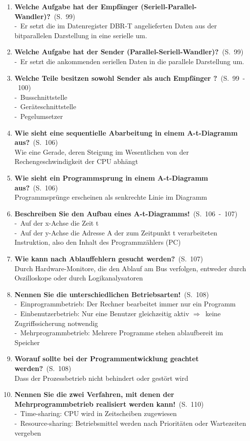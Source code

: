 \documentclass[a4paper,12pt]{article}
\newcommand{\question}[3]{\pagebreak[3]\item {\textbf{#1?}}\ (S.\ #2)#3}
\newcommand{\statement}[3]{\pagebreak[3]\item {\textbf{#1!}}\ (S.\ #2)#3}
\newcommand{\catchword}[1]{\\-\ #1}
\newcommand{\normaltext}[1]{\\#1}
\newcommand{\resultol}[1]{$\Rightarrow$\ #1}
\newcommand{\page}[1]{#1}
\newcommand{\pages}[2]{#1\ -\ #2}
\begin{document}
\begin{enumerate}
    \question{Welche Aufgabe hat der Empfänger (Seriell-Parallel-Wandler)}{\page{99}}
  {
    \catchword{Er setzt die im Datenregister DBR-T angelieferten Daten aus der bitparallelen 
               Darstellung in eine serielle um.}
  }

  \question{Welche Aufgabe hat der Sender (Parallel-Seriell-Wandler)}{\page{99}}
  {
    \catchword{Er setzt die ankommenden seriellen Daten in die parallele Darstellung um.}
  }

  \question{Welche Teile besitzen sowohl Sender als auch Empfänger }{\pages{99}{100}}
  {
    \catchword{Busschnittstelle}
    \catchword{Geräteschnittstelle}
    \catchword{Pegelumsetzer}
  }

  \question{Wie sieht eine sequentielle Abarbeitung in einem A-t-Diagramm aus}{\page{106}}
  {
    \normaltext{Wie eine Gerade, deren Steigung im Wesentlichen von der Rechengeschwindigkeit
                der CPU abhängt}
  }

  \question{Wie sieht ein Programmsprung in einem A-t-Diagramm aus}{\page{106}}
  {
    \normaltext{Programmsprünge erscheinen als senkrechte Linie im Diagramm}
  }

  \statement{Beschreiben Sie den Aufbau eines A-t-Diagramms}{\pages{106}{107}}
  {
    \catchword{Auf der x-Achse die Zeit t}
    \catchword{Auf der y-Achse die Adresse A der zum Zeitpunkt t verarbeiteten Instruktion,
               also den Inhalt des Programmzählers (PC)}
  }

  \question{Wie kann nach Ablauffehlern gesucht werden}{\page{107}}
  {
    \normaltext{Durch Hardware-Monitore, die den Ablauf am Bus verfolgen, entweder durch
                Oszilloskope oder durch Logikanalysatoren}
  }

  \statement{Nennen Sie die unterschiedlichen Betriebsarten}{\page{108}}
  {
    \catchword{Einprogrammbetrieb: Der Rechner bearbeitet immer nur ein Programm}
    \catchword{Einbenutzerbetrieb: Nur eine Benutzer gleichzeitig aktiv
               \resultol{keine Zugriffssicherung notwendig}}
    \catchword{Mehrprogrammbetrieb: Mehrere Programme stehen ablaufbereit im Speicher}
  }

  \question{Worauf sollte bei der Programmentwicklung geachtet werden}{\page{108}}
  {
    \normaltext{Dass der Prozessbetrieb nicht behindert oder gestört wird}
  }

  \statement{Nennen Sie die zwei Verfahren, mit denen der Mehrprogrammbetrieb
             realisiert werden kann}{\page{110}}
  {
    \catchword{Time-sharing: CPU wird in Zeitscheiben zugewiesen}
    \catchword{Resource-sharing: Betriebsmittel werden nach Prioritäten oder Wartezeiten vergeben}
  }


\end{enumerate}
\end{document}
